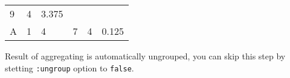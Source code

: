 \documentclass[]{article}
\newenvironment{Shaded}{\begin{snugshade}}{\end{snugshade}}
\newcommand{\AttributeTok}[1]{\textcolor[rgb]{0.77,0.63,0.00}{#1}}
\newcommand{\DecValTok}[1]{\textcolor[rgb]{0.00,0.00,0.81}{#1}}
\newcommand{\KeywordTok}[1]{\textcolor[rgb]{0.13,0.29,0.53}{\textbf{#1}}}
\newcommand{\NormalTok}[1]{#1}
\newcommand{\StringTok}[1]{\textcolor[rgb]{0.31,0.60,0.02}{#1}}
\newcommand{\VariableTok}[1]{\textcolor[rgb]{0.00,0.00,0.00}{#1}}
\begin{document}
\begin{longtable}[]{@{}llllll@{}}
\begin{minipage}[t]{0.14\columnwidth}
9\strut
\end{minipage} & \begin{minipage}[t]{0.18\columnwidth}\raggedright
4\strut
\end{minipage} & \begin{minipage}[t]{0.19\columnwidth}\raggedright
3.375\strut
\end{minipage}\tabularnewline
\begin{minipage}[t]{0.05\columnwidth}\raggedright
A\strut
\end{minipage} & \begin{minipage}[t]{0.14\columnwidth}\raggedright
1\strut
\end{minipage} & \begin{minipage}[t]{0.14\columnwidth}\raggedright
4\strut
\end{minipage} & \begin{minipage}[t]{0.14\columnwidth}\raggedright
7\strut
\end{minipage} & \begin{minipage}[t]{0.18\columnwidth}\raggedright
4\strut
\end{minipage} & \begin{minipage}[t]{0.19\columnwidth}\raggedright
0.125\strut
\end{minipage}\tabularnewline
\bottomrule
\end{longtable}

Result of aggregating is automatically ungrouped, you can skip this step
by stetting \texttt{:ungroup} option to \texttt{false}.

\begin{Shaded}
\end{Shaded}
\end{document}
